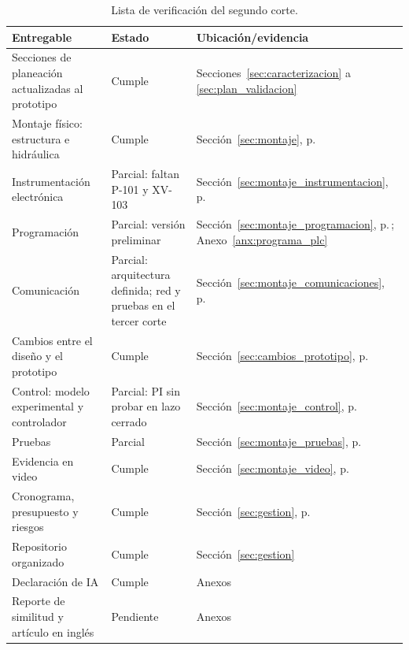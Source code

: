 \begin{table}[H]\centering\small\caption{Lista de verificación del segundo corte.}
\label{tab:checklist_corte2}
\begin{tabularx}{\textwidth}{Y L{2.4cm} L{4.2cm}}\toprule
\textbf{Entregable}&\textbf{Estado}&\textbf{Ubicación/evidencia}\\\midrule
Secciones de planeación actualizadas al prototipo&Cumple&Secciones~\ref{sec:caracterizacion} a \ref{sec:plan_validacion}\\
Montaje físico: estructura e hidráulica&Cumple&Sección~\ref{sec:montaje}, p.\,\pageref{sec:montaje}\\
Instrumentación electrónica&Parcial: faltan P-101 y XV-103&Sección~\ref{sec:montaje_instrumentacion}, p.\,\pageref{sec:montaje_instrumentacion}\\
Programación&Parcial: versión preliminar&Sección~\ref{sec:montaje_programacion}, p.\,\pageref{sec:montaje_programacion}; Anexo~\ref{anx:programa_plc}\\
Comunicación&Parcial: arquitectura definida; red y pruebas en el tercer corte&Sección~\ref{sec:montaje_comunicaciones}, p.\,\pageref{sec:montaje_comunicaciones}\\
Cambios entre el diseño y el prototipo&Cumple&Sección~\ref{sec:cambios_prototipo}, p.\,\pageref{sec:cambios_prototipo}\\
Control: modelo experimental y controlador&Parcial: PI sin probar en lazo cerrado&Sección~\ref{sec:montaje_control}, p.\,\pageref{sec:montaje_control}\\
Pruebas&Parcial&Sección~\ref{sec:montaje_pruebas}, p.\,\pageref{sec:montaje_pruebas}\\
Evidencia en video&Cumple&Sección~\ref{sec:montaje_video}, p.\,\pageref{sec:montaje_video}\\
Cronograma, presupuesto y riesgos&Cumple&Sección~\ref{sec:gestion}, p.\,\pageref{sec:gestion}\\
Repositorio organizado&Cumple&Sección~\ref{sec:gestion}\\
Declaración de IA&Cumple&Anexos\\
Reporte de similitud y artículo en inglés&Pendiente&Anexos\\\bottomrule
\end{tabularx}\end{table}
